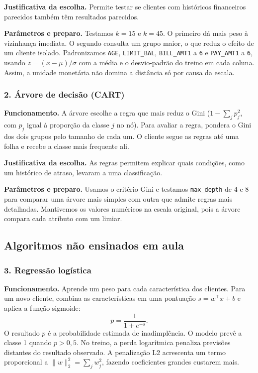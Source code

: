\documentclass[11pt,a4paper]{article}
\begin{document}
\textbf{Justificativa da escolha.} Permite testar se clientes com
históricos financeiros parecidos também têm resultados parecidos.

\textbf{Parâmetros e preparo.} Testamos $k=15$ e $k=45$. O primeiro dá
mais peso à vizinhança imediata. O segundo consulta um grupo maior, o que
reduz o efeito de um cliente isolado. Padronizamos \texttt{AGE},
\texttt{LIMIT\_BAL}, \texttt{BILL\_AMT1} a \texttt{6} e
\texttt{PAY\_AMT1} a \texttt{6}, usando $z=(x-\mu)/\sigma$ com a
média e o desvio-padrão do treino em cada coluna. Assim, a unidade
monetária não domina a distância só por causa da escala.

\subsubsection*{2. Árvore de decisão (CART)}
\textbf{Funcionamento.} A árvore escolhe a regra que mais reduz o Gini
($1-\sum_j p_j^2$, com $p_j$ igual à proporção da classe $j$ no nó).
Para avaliar a regra, pondera o Gini dos dois grupos pelo tamanho de cada
um. O cliente segue as regras até uma folha e recebe a classe mais
frequente ali.

\textbf{Justificativa da escolha.} As regras permitem explicar quais
condições, como um histórico de atraso, levaram a uma classificação.

\textbf{Parâmetros e preparo.} Usamos o critério Gini e testamos
\texttt{max\_depth} de 4 e 8 para comparar uma árvore mais simples com
outra que admite regras mais detalhadas. Mantivemos os valores numéricos
na escala original, pois a árvore compara cada atributo com um limiar.

\newpage
\subsection*{Algoritmos não ensinados em aula}

\subsubsection*{3. Regressão logística}
\textbf{Funcionamento.} Aprende um peso para cada característica dos
clientes. Para um novo cliente, combina as características em uma
pontuação $s=w^\top x+b$ e aplica a função sigmoide:
\[
   p=\frac{1}{1+e^{-s}}.
\]
O resultado $p$ é a probabilidade estimada de inadimplência. O modelo
prevê a classe 1 quando $p>0{,}5$. No treino, a perda logarítmica penaliza
previsões distantes do resultado observado. A penalização L2 acrescenta
um termo proporcional a $\lVert w\rVert_2^2=\sum_j w_j^2$, fazendo
coeficientes grandes custarem mais.
\end{document}
